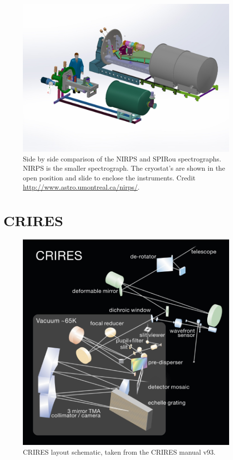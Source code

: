 \begin{figure}
    \centering
    \includegraphics[width=0.7\linewidth]{figures/spectroscopy/NIRPS-vs-SPIROU}
    \caption[Side by side comparison of the {NIRPS} and {SPIRou} spectrographs.]{Side by side comparison of the {NIRPS} and {SPIRou} spectrographs.
    {NIRPS} is the smaller spectrograph.
    The {cryostat's are} shown in the open position and slide to enclose the instruments.
    Credit \href{http://www.astro.umontreal.ca/nirps/}{http://www.astro.umontreal.ca/nirps/}.}
    \label{fig:nirps-vs-spirou}
\end{figure}

\section{CRIRES}
\label{sec:CRIRES}

\begin{figure}
    \centering
    \includegraphics[width=0.5\linewidth]{figures/spectroscopy/CRIRES_schematic.pdf}
    \caption[CRIRES layout schematic.]{CRIRES layout schematic, taken from the {CRIRES} manual v93.}
    \label{fig:criresschematic}
\end{figure}

